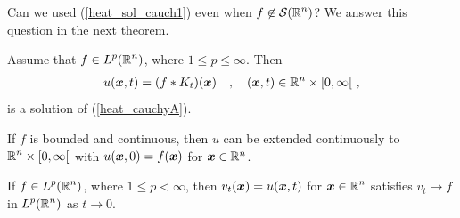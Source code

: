Can we used (\ref{heat_sol_cauch1}) even when
$\displaystyle f\not\in \mathcal{S}(\mathbb{R}^n)$?
We answer this question in the next theorem.

\begin{theorem} \label{heat_solution_hs}
Assume that $\displaystyle f \in L^p(\mathbb{R}^n)$, where $1\leq p \leq \infty$.  Then
\begin{align} \label{heat_sol_cauch}
u({\bm{x}},t) = (f \ast K_t)({\bm{x}}) \quad , \quad
({\bm{x}},t) \in \mathbb{R}^n \times [0,\infty[ \  , 
\end{align}
is a solution of (\ref{heat_cauchyA}).

If $f$ is bounded and continuous, then $u$ can be extended
continuously to $\displaystyle \mathbb{R}^n \times [0,\infty[$ with
$u({\bm{x}},0) = f({\bm{x}})$ for ${\bm{x}} \in \mathbb{R}^n$.

If $\displaystyle f \in L^p(\mathbb{R}^n)$, where $1\leq p < \infty$, then
$v_t({\bm{x}}) = u({\bm{x}},t)$ for $\displaystyle {\bm{x}} \in \mathbb{R}^n$ satisfies
$v_t \rightarrow f$ in $\displaystyle L^p(\mathbb{R}^n)$ as $t\rightarrow 0$.
\end{theorem}

